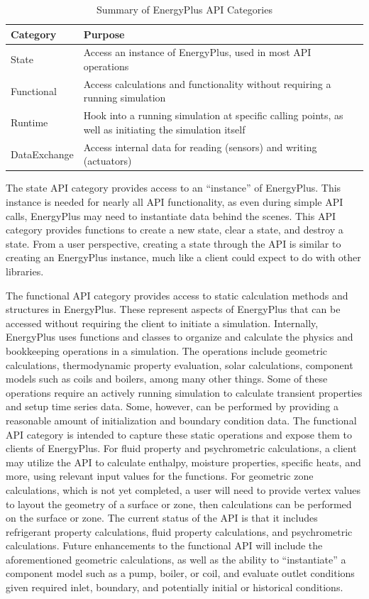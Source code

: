 \documentclass[5p, authoryear]{elsarticle}
\begin{document}
\begin{table}
\begin{center}
\caption{Summary of EnergyPlus API Categories}
\begin{tabular}{lp{2.25in}}
\toprule
Category     & Purpose \\
\midrule
State        & Access an instance of EnergyPlus, used in most API operations \\
Functional   & Access calculations and functionality without requiring a running simulation \\
Runtime      & Hook into a running simulation at specific calling points, as well as initiating the simulation itself \\
DataExchange & Access internal data for reading (sensors) and writing (actuators) \\ 
\bottomrule
\end{tabular}
\label{table:api:purpose:classes}
\end{center}
\end{table}

The state API category provides access to an ``instance'' of EnergyPlus.
This instance is needed for nearly all API functionality, as even during simple API calls, EnergyPlus may need to instantiate data behind the scenes.
This API category provides functions to create a new state, clear a state, and destroy a state.
From a user perspective, creating a state through the API is similar to creating an EnergyPlus instance, much like a client could expect to do with other libraries.

The functional API category provides access to static calculation methods and structures in EnergyPlus.  
These represent aspects of EnergyPlus that can be accessed without requiring the client to initiate a simulation.
Internally, EnergyPlus uses functions and classes to organize and calculate the physics and bookkeeping operations in a simulation.
The operations include geometric calculations, thermodynamic property evaluation, solar calculations, component models such as coils and boilers, among many other things.
Some of these operations require an actively running simulation to calculate transient properties and setup time series data.
Some, however, can be performed by providing a reasonable amount of initialization and boundary condition data.
The functional API category is intended to capture these static operations and expose them to clients of EnergyPlus.
For fluid property and psychrometric calculations, a client may utilize the API to calculate enthalpy, moisture properties, specific heats, and more, using relevant input values for the functions.
For geometric zone calculations, which is not yet completed, a user will need to provide vertex values to layout the geometry of a surface or zone, then calculations can be performed on the surface or zone.
The current status of the API is that it includes refrigerant property calculations, fluid property calculations, and psychrometric calculations.
Future enhancements to the functional API will include the aforementioned geometric calculations, as well as the ability to ``instantiate'' a component model such as a pump, boiler, or coil, and evaluate outlet conditions given required inlet, boundary, and potentially initial or historical conditions.
\end{document}
